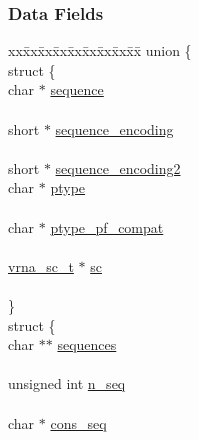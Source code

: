 \subsubsection*{Data Fields}
\begin{DoxyCompactItemize}
\item 
\begin{tabbing}
xx\=xx\=xx\=xx\=xx\=xx\=xx\=xx\=xx\=\kill
union \{\\
\>struct \{\\
\>\>char $\ast$ \mbox{\hyperlink{group__fold__compound_a87f6abcda89cfb7a486c97e1f5371525}{sequence}}\\
\>\>\\
\>\>short $\ast$ \mbox{\hyperlink{group__fold__compound_a9934bdb695d35a3544285cbcc19f9763}{sequence\_encoding}}\\
\>\>\\
\>\>short $\ast$ \mbox{\hyperlink{group__fold__compound_aaf9064092f674882e78665e1646ffdbf}{sequence\_encoding2}}\\
\>\>char $\ast$ \mbox{\hyperlink{group__fold__compound_a3fbea559f1d1976b2d67c215cdeee0b2}{ptype}}\\
\>\>\\
\>\>char $\ast$ \mbox{\hyperlink{group__fold__compound_a7fe1235ce3d41287695f1ae1e283e8fc}{ptype\_pf\_compat}}\\
\>\>\\
\>\>\mbox{\hyperlink{group__soft__constraints_ga75401ce219ef8dbcceb672db82d434c6}{vrna\_sc\_t}} $\ast$ \mbox{\hyperlink{group__fold__compound_ac7089e90460ad3990a308808c8044c9f}{sc}}\\
\>\>\\
\>\} \\
\>struct \{\\
\>\>char $\ast$$\ast$ \mbox{\hyperlink{group__fold__compound_a965dbb42f2e13cace5aa3bbab4396530}{sequences}}\\
\>\>\\
\>\>unsigned int \mbox{\hyperlink{group__fold__compound_a614702ab74478e786272be44f8cebfe3}{n\_seq}}\\
\>\>\\
\>\>char $\ast$ \mbox{\hyperlink{group__fold__compound_ac472afde64d8b3c8b84e4809fda7d814}{cons\_seq}}\\
$$
\end{tabbing}
\end{DoxyCompactItemize}

